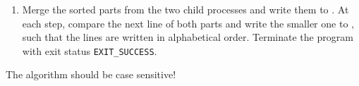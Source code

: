 \begin{enumerate}
\item Merge the sorted parts from the two child processes
and write them to .
At each step, compare the next line of both parts
and write the smaller one to ,
such that the lines are written in alphabetical order.
Terminate the program with exit status \verb|EXIT_SUCCESS|.

\end{enumerate}

The algorithm should be case sensitive!


